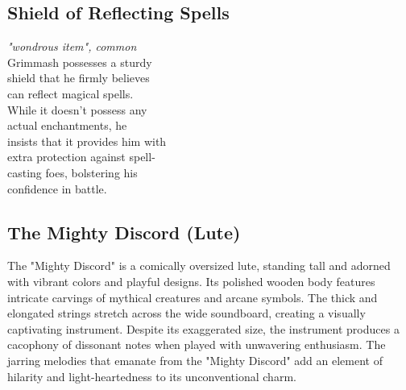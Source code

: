 \documentclass[letterpaper,openany,oneside,twocolumn]{book}
\begin{document}
\subsection*{Shield of Reflecting Spells}
\textit{"wondrous item", common}\\
Grimmash possesses a sturdy\\
shield that he firmly believes\\
can reflect magical spells.\\
While it doesn't possess any\\
actual enchantments, he\\
insists that it provides him with\\
extra protection against spell-\\
casting foes, bolstering his\\
confidence in battle.
%

\subsection*{The Mighty Discord (Lute)}
The "Mighty Discord" is a comically oversized lute, standing tall and adorned with vibrant colors and playful designs. Its polished wooden body features intricate carvings of mythical creatures and arcane symbols. The thick and elongated strings stretch across the wide soundboard, creating a visually captivating instrument. Despite its exaggerated size, the instrument produces a cacophony of dissonant notes when played with unwavering enthusiasm. The jarring melodies that emanate from the "Mighty Discord" add an element of hilarity and light-heartedness to its unconventional charm.
\end{document}
